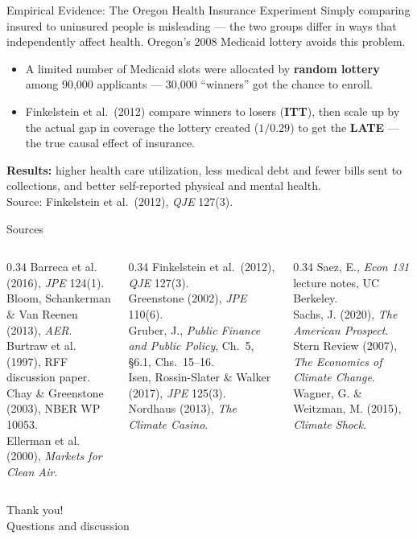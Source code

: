 \documentclass[11pt,aspectratio=169]{beamer}
\newcommand{\srcnote}[1]{{\footnotesize\color{wugray}Source: #1}}
\begin{document}
\begin{frame}{Empirical Evidence: The Oregon Health Insurance Experiment}
  Simply comparing insured to uninsured people is misleading --- the two groups differ in ways that independently affect health. Oregon's 2008 Medicaid lottery avoids this problem.
  \begin{itemize}
    \item A limited number of Medicaid slots were allocated by \textbf{random lottery} among 90{,}000 applicants --- 30{,}000 ``winners'' got the chance to enroll.
    \item Finkelstein et al.\ (2012) compare winners to losers (\textbf{ITT}), then scale up by the actual gap in coverage the lottery created ($1/0.29$) to get the \textbf{LATE} --- the true causal effect of insurance.
  \end{itemize}
  \textbf{Results:} higher health care utilization, less medical debt and fewer bills sent to collections, and better self-reported physical and mental health.\\
  \srcnote{Finkelstein et al.\ (2012), \emph{QJE} 127(3).}
\end{frame}

\begin{frame}{Sources}
  \tiny
  \begin{columns}[T]
    \begin{column}{0.34\textwidth}
      Barreca et al. (2016), \emph{JPE} 124(1).\\
      Bloom, Schankerman \& Van Reenen (2013), \emph{AER}.\\
      Burtraw et al. (1997), RFF discussion paper.\\
      Chay \& Greenstone (2003), NBER WP 10053.\\
      Ellerman et al. (2000), \emph{Markets for Clean Air}.
    \end{column}
    \begin{column}{0.34\textwidth}
      Finkelstein et al.\ (2012), \emph{QJE} 127(3).\\
      Greenstone (2002), \emph{JPE} 110(6).\\
      Gruber, J., \emph{Public Finance and Public Policy}, Ch.\ 5, \S6.1, Chs.\ 15--16.\\
      Isen, Rossin-Slater \& Walker (2017), \emph{JPE} 125(3).\\
      Nordhaus (2013), \emph{The Climate Casino}.
    \end{column}
    \begin{column}{0.34\textwidth}
      Saez, E., \emph{Econ 131} lecture notes, UC Berkeley.\\
      Sachs, J. (2020), \emph{The American Prospect}.\\
      Stern Review (2007), \emph{The Economics of Climate Change}.\\
      Wagner, G. \& Weitzman, M. (2015), \emph{Climate Shock}.
    \end{column}
  \end{columns}
\end{frame}

\begin{frame}[standout]
  Thank you!\\
  \vspace{0.5em}
  \small Questions and discussion
\end{frame}
\end{document}
